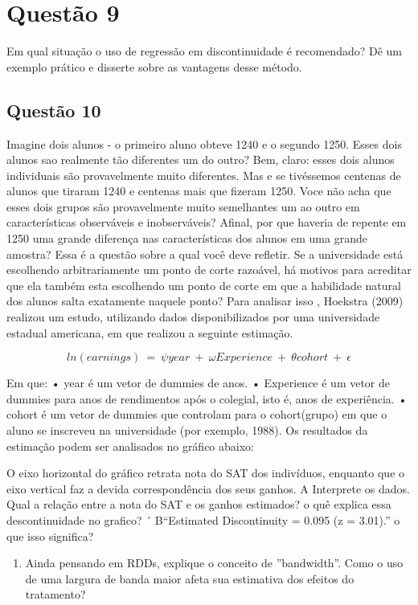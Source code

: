\documentclass[
]{article}
\providecommand{\tightlist}{%
  \setlength{\itemsep}{0pt}\setlength{\parskip}{0pt}}
\begin{document}
\hypertarget{questuxe3o-9}{%
\section{Questão 9}\label{questuxe3o-9}}

Em qual situação o uso de regressão em discontinuidade é recomendado? Dê
um exemplo prático e disserte sobre as vantagens desse método.

\hypertarget{questuxe3o-10}{%
\subsection{Questão 10}\label{questuxe3o-10}}

Imagine dois alunos - o primeiro aluno obteve 1240 e o segundo 1250.
Esses dois alunos sao realmente tão diferentes um do outro? Bem, claro:
esses dois alunos individuais são provavelmente muito diferentes. Mas e
se tivéssemos centenas de alunos que tiraram 1240 e centenas mais que
fizeram 1250. Voce não acha que esses dois grupos são provavelmente
muito semelhantes um ao outro em características observáveis e
inobserváveis? Afinal, por que haveria de repente em 1250 uma grande
diferença nas características dos alunos em uma grande amostra? Essa é a
questão sobre a qual você deve refletir. Se a universidade está
escolhendo arbitrariamente um ponto de corte razoável, há motivos para
acreditar que ela também esta escolhendo um ponto de corte em que a
habilidade natural dos alunos salta exatamente naquele ponto? Para
analisar isso , Hoekstra (2009) realizou um estudo, utilizando dados
disponibilizados por uma universidade estadual americana, em que
realizou a seguinte estimação.

\[ln(earnings)\ =\ \psi year\ +\ \omega Experience\ +\ \theta cohort\ +\ \epsilon\]

Em que: • year é um vetor de dummies de anos. • Experience é um vetor de
dummies para anos de rendimentos após o colegial, isto é, anos de
experiência. • cohort é um vetor de dummies que controlam para o
cohort(grupo) em que o aluno se inscreveu na universidade (por exemplo,
1988). Os resultados da estimação podem ser analisados no gráfico
abaixo:

O eixo horizontal do gráfico retrata nota do SAT dos indivíduos,
enquanto que o eixo vertical faz a devida correspondência dos seus
ganhos. A Interprete os dados. Qual a relação entre a nota do SAT e os
ganhos estimados? o quê explica essa descontinuidade no grafico? ´
B``Estimated Discontinuity = 0.095 (z = 3.01).'' o que isso significa?

\begin{enumerate}
\def\labelenumi{\arabic{enumi}.}
\setcounter{enumi}{10}
\tightlist
\item
  Ainda pensando em RDDs, explique o conceito de ''bandwidth''. Como o
  uso de uma largura de banda maior afeta sua estimativa dos efeitos do
  tratamento?
\end{enumerate}
\end{document}
